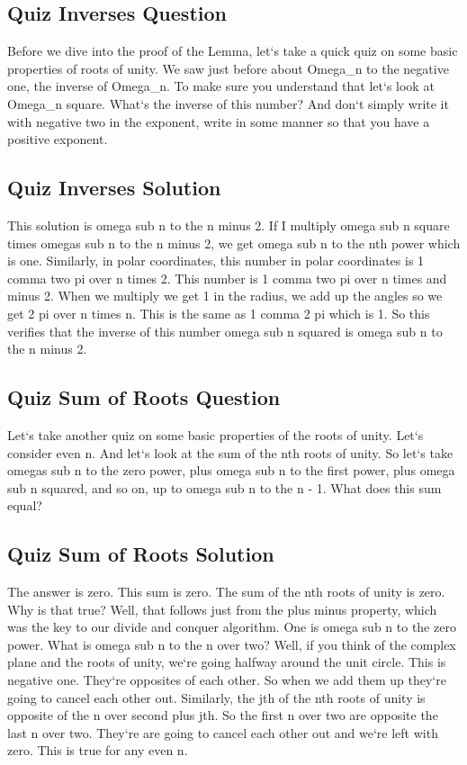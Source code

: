 \subsection{Quiz  Inverses Question}
Before we dive into the proof of the Lemma, let`s take a quick quiz on some basic properties of roots of unity.
We saw just before about Omega\_n to the negative one, the inverse of Omega\_n.
To make sure you understand that let`s look at Omega\_n square.
What`s the inverse of this number? And don`t simply write it with negative two in the exponent, write in some manner so that you have a positive exponent.

\subsection{Quiz  Inverses Solution}
This solution is omega sub n to the n minus 2.
If I multiply omega sub n square times omegas sub n to the n minus 2, we get omega sub n to the nth power which is one.
Similarly, in polar coordinates, this number in polar coordinates is 1 comma two pi over n times 2.
This number is 1 comma two pi over n times and minus 2.
When we multiply we get 1 in the radius, we add up the angles so we get 2 pi over n times n.
This is the same as 1 comma 2 pi which is 1.
So this verifies that the inverse of this number omega sub n squared is omega sub n to the n minus 2.

\subsection{Quiz  Sum of Roots Question}
Let`s take another quiz on some basic properties of the roots of unity.
Let`s consider even n.
And let`s look at the sum of the nth roots of unity.
So let`s take omegas sub n to the zero power, plus omega sub n to the first power, plus omega sub n squared, and so on, up to omega sub n to the n - 1.
What does this sum equal?

\subsection{Quiz  Sum of Roots Solution}
The answer is zero.
This sum is zero.
The sum of the nth roots of unity is zero.
Why is that true? Well, that follows just from the plus minus property, which was the key to our divide and conquer algorithm.
One is omega sub n to the zero power.
What is omega sub n to the n over two? Well, if you think of the complex plane and the roots of unity, we`re going halfway around the unit circle.
This is negative one.
They`re opposites of each other.
So when we add them up they`re going to cancel each other out.
Similarly, the jth of the nth roots of unity is opposite of the n over second plus jth.
So the first n over two are opposite the last n over two.
They`re are going to cancel each other out and we`re left with zero.
This is true for any even n.

